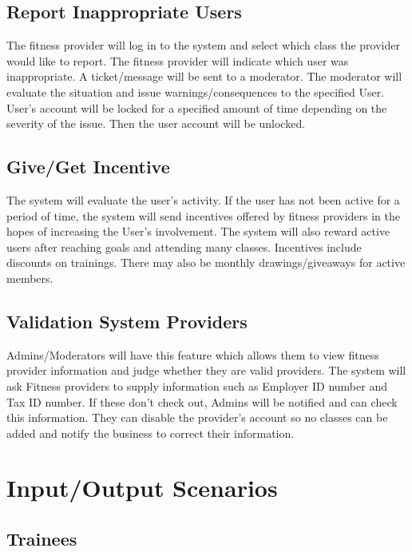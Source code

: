 \documentclass[12pt]{article}
\begin{document}
\subsection{Report Inappropriate Users}
The fitness provider will log in to the system and select which class the provider would like to report. The fitness provider will indicate which user was inappropriate. A ticket/message will be sent to a moderator.  The moderator will evaluate the situation and issue warnings/consequences to the specified User.  User’s account will be locked for a specified amount of time depending on the severity of the issue.  Then the user account will be unlocked.

\subsection{Give/Get Incentive}
The system will evaluate the user’s activity. If the user has not been active for a period of time, the system will send incentives offered by fitness providers in the hopes of increasing the User’s involvement.  The system will also reward active users after reaching goals and attending many classes.  Incentives include discounts on trainings.  There may also be monthly drawings/giveaways for active members.

\subsection{Validation System Providers}
Admins/Moderators will have this feature which allows them to view fitness provider information and judge whether they are valid providers.  The system will ask Fitness providers to supply information such as Employer ID number and Tax ID number.  If these don’t check out, Admins will be notified and can check this information.  They can disable the provider’s account so no classes can be added and notify the business to correct their information.

\section{Input/Output Scenarios}
\subsection{Trainees}
\end{document}
